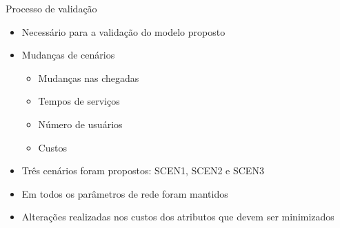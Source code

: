 \begin{frame}
  \begin{block}{Processo de validação}
    \begin{itemize}
      \item Necessário para a validação do modelo proposto
      \item Mudanças de cenários
      \begin{itemize}
        \item Mudanças nas chegadas
        \item Tempos de serviços
        \item Número de usuários
        \item Custos
      \end{itemize}
      \item Três cenários foram propostos: \alert{SCEN1}, \alert{SCEN2} e \alert{SCEN3}
      \item Em todos os parâmetros de rede foram mantidos  
      \item Alterações realizadas nos custos dos atributos que devem ser minimizados
    \end{itemize}
  \end{block}
\end{frame}

